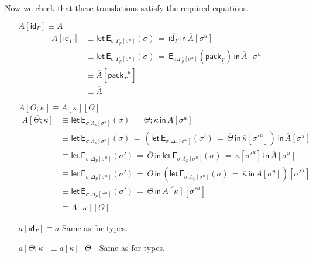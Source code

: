 \documentclass[10pt]{article}
\theoremstyle{definition}
\newcommand{\id}{\mathsf{id}}
\newcommand\EEs[4]{\ensuremath{\mathsf{let} \, \mathsf{E}_{#1}(#3) \, = \, {#2} \, \mathsf{in} \, #4}}
\newcommand\EIs[2]{\ensuremath{\mathsf{E}_{#1}{(#2)}}}
\newcommand\pack[1]{\ensuremath{\mathsf{pack}_{#1}}}
\newcommand\unp[2]{\ensuremath{{#2}^u}}
\newcommand{\modeof}[1]{{#1}_p}
\newcommand{\upstairs}[1]{\overline{#1}}
\newcommand{\downstairs}[1]{\underline{#1}}
\begin{document}
Now we check that these translations satisfy the required equations.

\begin{enumerate}[style = multiline, labelwidth = 80pt]
\item[{$A[\id_\Gamma] \equiv A$}] 
\begin{align*}
\upstairs{A[\id_\Gamma]}
&\equiv \EEs{\sigma.\modeof{\Gamma}[\unp{\Gamma}{\sigma}]}{\upstairs{\id_\Gamma}}{\sigma}{\upstairs{A}[\unp{\Gamma}{\sigma}]} \\
&\equiv \EEs{\sigma.\modeof{\Gamma}[\unp{\Gamma}{\sigma}]}{\EIs{\sigma.\modeof{\Gamma}[\unp{\Gamma}{\sigma}]}{\pack{\downstairs{\Gamma}}}}{\sigma}{\upstairs{A}[\unp{\Gamma}{\sigma}]} \\
&\equiv \upstairs{A}[\unp{\Gamma}{\pack{\downstairs{\Gamma}}}]\\
&\equiv \upstairs{A}
\end{align*}

\item[{$A[\Theta ; \kappa] \equiv A[\kappa][\Theta]$}] 
\begin{align*}
\upstairs{A[\Theta ; \kappa]}
&\equiv \EEs{\sigma.\modeof{\Lambda}[\unp{\Lambda}{\sigma}]}{\upstairs{\Theta ; \kappa}}{\sigma}{\upstairs{A}[\unp{\Lambda}{\sigma}]} \\
&\equiv \EEs{\sigma.\modeof{\Lambda}[\unp{\Lambda}{\sigma}]}{(\EEs{\sigma.\modeof{\Delta}[\unp{\Delta}{\sigma}]}{\upstairs{\Theta}}{\sigma'}{\upstairs{\kappa}[\unp{\upstairs{\Delta}}{\sigma'}]})}{\sigma}{\upstairs{A}[\unp{\Lambda}{\sigma}]} \\
&\equiv \EEs{\sigma.\modeof{\Delta}[\unp{\Delta}{\sigma}]}{\upstairs{\Theta}}{\sigma'}{\EEs{\sigma.\modeof{\Lambda}[\unp{\Lambda}{\sigma}]}{\upstairs{\kappa}[\unp{\upstairs{\Delta}}{\sigma'}]}{\sigma}{\upstairs{A}[\unp{\Lambda}{\sigma}]}} \\
&\equiv \EEs{\sigma.\modeof{\Delta}[\unp{\Delta}{\sigma}]}{\upstairs{\Theta}}{\sigma'}{(\EEs{\sigma.\modeof{\Lambda}[\unp{\Lambda}{\sigma}]}{\upstairs{\kappa}}{\sigma}{\upstairs{A}[\unp{\Lambda}{\sigma}]})[\unp{\Delta}{\sigma'}]} \\
&\equiv \EEs{\sigma.\modeof{\Delta}[\unp{\Delta}{\sigma}]}{\upstairs{\Theta}}{\sigma'}{\upstairs{A[\kappa]}[\unp{\Lambda}{\sigma'}]} \\
&\equiv \upstairs{A[\kappa][\Theta]}
\end{align*}

\item[{$a[\id_\Gamma] \equiv a$}] Same as for types.
\item[{$a[\Theta ; \kappa] \equiv a[\kappa][\Theta]$}] Same as for types.


\end{enumerate}
\end{document}

